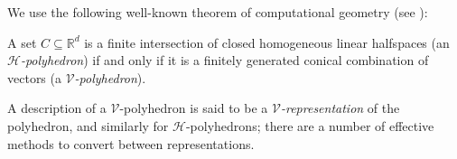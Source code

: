 \documentclass[runningheds]{llncs}
\newcommand{\RR}{\mathbb{R}}
\begin{document}
We use the following well-known theorem of computational geometry (see \cite[Section 1.1]{ziegler:95}):
\begin{theorem}
 A set $C\subseteq \RR^d$ is a finite intersection of closed homogeneous linear halfspaces (an \emph{$\mathcal{H}$-polyhedron}) if and only if it is a finitely generated conical combination of vectors (a \emph{$\mathcal{V}$-polyhedron}).
\end{theorem}

A description of a $\mathcal{V}$-polyhedron is said to be a
\emph{$\mathcal{V}$-representation} of the polyhedron, and similarly
for $\mathcal{H}$-polyhedrons; there are a number of effective methods to convert between representations. 
\end{document}
